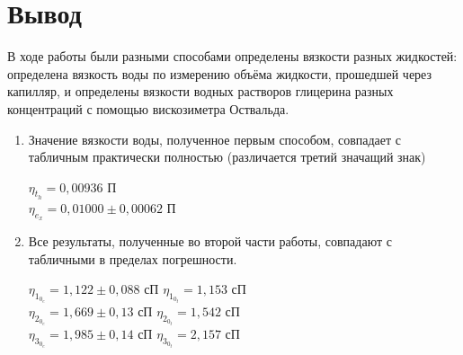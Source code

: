 \documentclass[a4paper]{article}
\begin{document}
\section{Вывод}
 В ходе работы были разными способами определены вязкости разных жидкостей: определена вязкость воды по измерению объёма жидкости, прошедшей через капилляр, и определены вязкости водных растворов глицерина разных концентраций  с помощью вискозиметра Оствальда.
 \begin{enumerate}
     \item Значение вязкости воды, полученное первым способом, совпадает с табличным практически полностью (различается третий значащий знак)
     \begin{center}
    $\eta_t_h = 0,00936$ П \hspace{1cm}\\ $\eta_e_x = 0,01000 \pm 0,00062$ П
    \end{center}
     \item Все результаты, полученные во второй части работы, совпадают с табличными в пределах погрешности.\\
     \begin{center}
     $\eta_1_0_e = 1,122 \pm 0,088$ сП \hspace{1cm} $\eta_1_0_t = 1,153$ сП\\
    $\eta_2_0_e = 1,669 \pm 0,13$ сП \hspace{1cm} $\eta_2_0_t = 1,542$ сП\\
    $\eta_3_0_e = 1,985 \pm 0,14$ сП \hspace{1cm} $\eta_3_0_t = 2,157$ сП\\
    \end{center}
 \end{enumerate}
\end{document}
